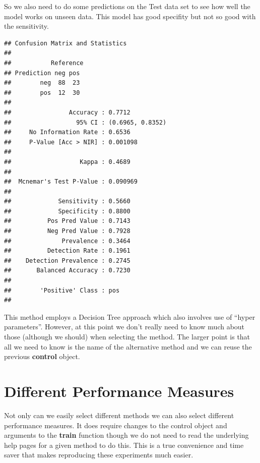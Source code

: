 \documentclass[
]{book}
\newenvironment{Shaded}{\begin{snugshade}}{\end{snugshade}}
\newcommand{\DataTypeTok}[1]{\textcolor[rgb]{0.13,0.29,0.53}{#1}}
\newcommand{\KeywordTok}[1]{\textcolor[rgb]{0.13,0.29,0.53}{\textbf{#1}}}
\newcommand{\NormalTok}[1]{#1}
\newcommand{\OperatorTok}[1]{\textcolor[rgb]{0.81,0.36,0.00}{\textbf{#1}}}
\newcommand{\StringTok}[1]{\textcolor[rgb]{0.31,0.60,0.02}{#1}}
\begin{document}
So we also need to do some predictions on the Test data set to see how well the model works on unseen data. This model has good specifity but not so good with the sensitivity.

\begin{Shaded}
\end{Shaded}

\begin{verbatim}
## Confusion Matrix and Statistics
## 
##           Reference
## Prediction neg pos
##        neg  88  23
##        pos  12  30
##                                           
##                Accuracy : 0.7712          
##                  95% CI : (0.6965, 0.8352)
##     No Information Rate : 0.6536          
##     P-Value [Acc > NIR] : 0.001098        
##                                           
##                   Kappa : 0.4689          
##                                           
##  Mcnemar's Test P-Value : 0.090969        
##                                           
##             Sensitivity : 0.5660          
##             Specificity : 0.8800          
##          Pos Pred Value : 0.7143          
##          Neg Pred Value : 0.7928          
##              Prevalence : 0.3464          
##          Detection Rate : 0.1961          
##    Detection Prevalence : 0.2745          
##       Balanced Accuracy : 0.7230          
##                                           
##        'Positive' Class : pos             
## 
\end{verbatim}

This method employs a Decision Tree approach which also involves use of ``hyper parameters''. However, at this point we don't really need to know much about those (although we should) when selecting the method. The larger point is that all we need to know is the name of the alternative method and we can reuse the previous \textbf{control} object.

\hypertarget{different-performance-measures}{%
\section{Different Performance Measures}\label{different-performance-measures}}

Not only can we easily select different methods we can also select different performance measures. It does require changes to the control object and arguments to the \textbf{train} function though we do not need to read the underlying help pages for a given method to do this. This is a true convenience and time saver that makes reproducing these experiments much easier.
\end{document}
